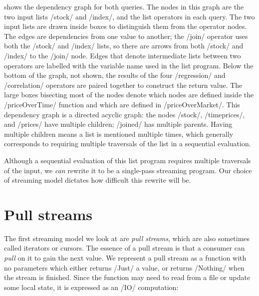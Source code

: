 % 

 shows the dependency graph for both queries.
The nodes in this graph are the two input lists \Hs/stock/ and \Hs/index/, and the list operators in each query.
The two input lists are drawn inside boxes to distinguish them from the operator nodes.
The edges are dependencies from one value to another; the \Hs/join/ operator uses both the \Hs/stock/ and \Hs/index/ lists, so there are arrows from both \Hs/stock/ and \Hs/index/ to the \Hs/join/ node.
Edges that denote intermediate lists between two operators are labelled with the variable name used in the list program.
Below the bottom of the graph, not shown, the results of the four \Hs/regression/ and \Hs/correlation/ operators are paired together to construct the return value.
The large boxes bisecting most of the nodes denote which nodes are defined inside the \Hs/priceOverTime/ function and which are defined in \Hs/priceOverMarket/.
This dependency graph is a directed acyclic graph: the nodes \Hs/stock/, \Hs/timeprices/, and \Hs/prices/ have multiple children; \Hs/joined/ has multiple parents.
Having multiple children means a list is mentioned multiple times, which generally corresponds to requiring multiple traversals of the list in a sequential evaluation.

Although a sequential evaluation of this list program requires multiple traversals of the input, we \emph{can} rewrite it to be a single-pass streaming program.
Our choice of streaming model dictates how difficult this rewrite will be.

\section{Pull streams}
\label{taxonomy/pull}

The first streaming model we look at are \emph{pull streams}, which are also sometimes called iterators or cursors.
The essence of a pull stream is that a consumer can \emph{pull} on it to gain the next value.
We represent a pull stream as a function with no parameters which either returns \Hs/Just/ a value, or returns \Hs/Nothing/ when the stream is finished.
Since the function may need to read from a file or update some local state, it is expressed as an \Hs/IO/ computation:

